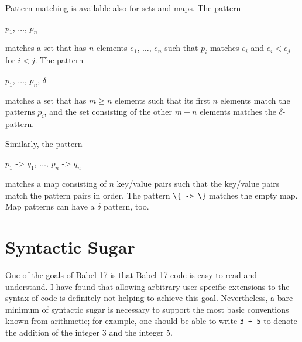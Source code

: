 \documentclass[11pt]{amsart}
\newcommand{\babelsrc}[1] {\lstinline!#1!}
\begin{document}
Pattern matching is available also for sets and maps. The pattern 
\begin{babellisting}
{$p_1$, $\ldots$, $p_n$}
\end{babellisting}
matches a set that has $n$ elements $e_1$, $\ldots$, $e_n$ such that $p_i$ matches $e_i$ and $e_i < e_j$ for $i < j$. The pattern
\begin{babellisting}
{$p_1$, $\ldots$, $p_n$, $\delta$}
\end{babellisting}
matches a set that has $m \ge n$ elements such that its first $n$ elements match the patterns $p_i$, and the set consisting of the other $m-n$ elements matches the $\delta$-pattern. 

Similarly, the pattern
\begin{babellisting}
{$p_1$ -> $q_1$, $\ldots$, $p_n$ -> $q_n$}
\end{babellisting}
matches a map consisting of $n$ key/value pairs such that the key/value pairs match the pattern pairs in order.
The pattern \babelsrc{\{ -> \}} matches the empty map. Map patterns can have a $\delta$ pattern, too.

\section{Syntactic Sugar}
One of the goals of Babel-17 is that Babel-17 code is easy to read and understand. I have found that allowing arbitrary user-specific extensions to the syntax of code is definitely not helping to achieve this goal. Nevertheless, a bare minimum of syntactic sugar is necessary to support the most basic conventions known from arithmetic; for example, one should be able to write \texttt{3 + 5} to denote the addition of the integer 3 and the integer 5.
\end{document}
